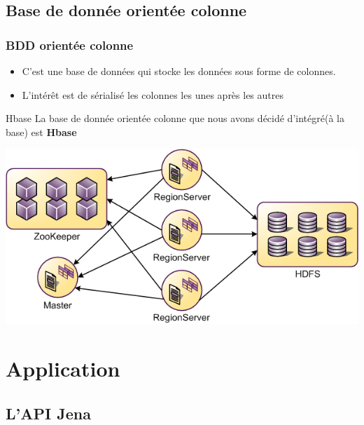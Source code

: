 \documentclass[12pt]{beamer}
\begin{document}
\subsection{Base de donnée orientée colonne}
\begin{frame}
\frametitle{BDD orientée colonne}
\begin{itemize}
\item C'est une base de données qui stocke les données sous forme de colonnes.
\item L'intérêt est de sérialisé les colonnes les unes après les autres
\end{itemize}

\begin{block}{Hbase}
La base de donnée orientée colonne que nous avons décidé d'intégré(à la base) est \textbf{Hbase}
\end{block}
\begin{center}
\includegraphics[scale=0.3]{hbase-shema.png} 

\label{fig_hbase}
\end{center}

\end{frame}
\section{Application}

\subsection{L'API Jena}
\end{document}
